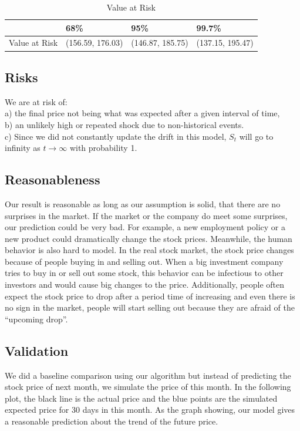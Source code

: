 \documentclass{article}
\begin{document}
\begin{table}[hbt]
\centering
\caption{Value at Risk}
\label{VaR}
\begin{tabular}{|l|l|l|l|}
\hline
\multicolumn{1}{|c|}{} & 68\%             & 95\%             & 99.7\%           \\ \hline
Value at Risk          & (156.59, 176.03) & (146.87, 185.75) & (137.15, 195.47) \\ \hline
\end{tabular}
\end{table}

\subsection{Risks}
We are at risk of:\\
a) the final price not being what was expected after a given interval of time,\\
b) an unlikely high or repeated shock due to non-historical events.\\
c) Since we did not constantly update the drift in this model, $S_t$ will go to infinity as $t \rightarrow \infty$ with probability 1.\cite{GBM}

\subsection{Reasonableness}
Our result is reasonable as long as our assumption is solid, that there are no surprises in the market. If the market or the company do meet some surprises, our prediction could be very bad. For example, a new employment policy or a new product could dramatically change the stock prices. Meanwhile, the human behavior is also hard to model. In the real stock market, the stock price changes because of people buying in and selling out. When a big investment company tries to buy in or sell out some stock, this behavior can be infectious to other investors and would cause big changes to the price. Additionally, people often expect the stock price to drop after a period time of increasing and even there is no sign in the market, people will start selling out because they are afraid of the ``upcoming drop”. 


\subsection{Validation}
We did a baseline comparison using our algorithm but instead of predicting the stock price of next month, we simulate the price of this month. In the following plot, the black line is the actual price and the blue points are the simulated expected price for 30 days in this month. As the graph showing, our model gives a reasonable prediction about the trend of the future price. 
\end{document}

